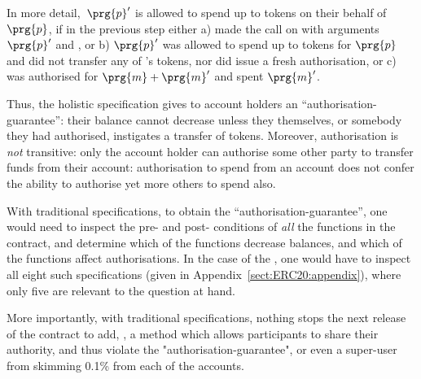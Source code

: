 In more detail,\  $\prg{p}'$ is allowed to spend 
up to  tokens on their behalf of $\prg{p}$, if in the   previous step either a)
  made the call  on  
with arguments $\prg{p}'$ and , or b)  
$\prg{p}'$ was allowed to spend  up to  tokens for $\prg{p}$
and did not transfer any of 's tokens, nor did  issue a fresh authorisation,
or c)  was authorised for $\prg{m}+\prg{m}'$ and spent $\prg{m}'$. 
  
  \vspace{.1cm}
 
 Thus, the holistic specification gives to account holders an
 ``authorisation-guarantee'': their balance cannot decrease unless they
 themselves, or somebody they had authorised, instigates a transfer of
 tokens. Moreover, authorisation is {\em not} transitive: only the
 account holder can authorise some other party to transfer funds from
 their account: authorisation to spend from an account does not confer
 the ability to authorise yet more others to spend also.
 
 
 With traditional  specifications, to obtain the ``authorisation-guarantee'', 
one would need to inspect the pre- and post- conditions of {\em all} the functions
in the contract, and determine which of the functions decrease balances, and which of the functions 
 affect authorisations.
 In the case of the , one would have to inspect all eight such specifications
 (given in Appendix~\ref{sect:ERC20:appendix}), 
 where only five are relevant to the question at hand.
  
More importantly, with traditional  specifications, nothing stops the next release of the contract to add, 
\eg, a method which allows participants to share their authority, and thus
violate the "authorisation-guarantee", or even a super-user from skimming 0.1\% from each of the accounts.

